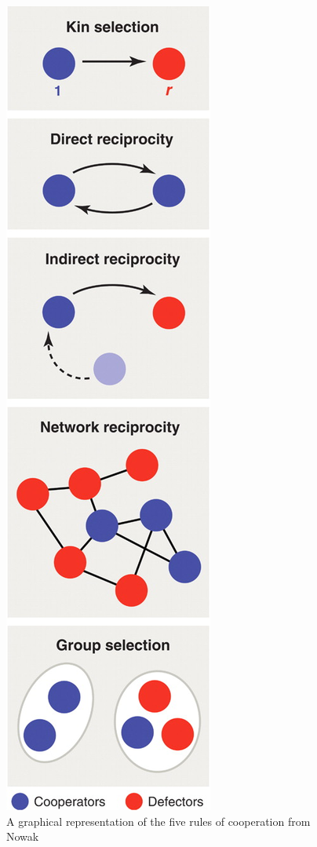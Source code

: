 \documentclass[twoside,twocolumn]{article}
\begin{document}
\begin{figure}
\begin{center}
	\includegraphics[scale=0.2]{Nowak5rules.jpg}
	\caption{A graphical representation of the five rules of cooperation from Nowak~\cite{five_rules_coop}}
	\label{fig:5rules}
\end{center}
\end{figure}
\end{document}
